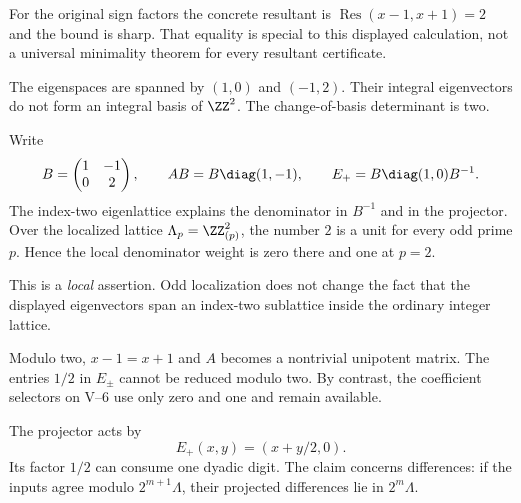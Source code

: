 For the original sign factors the concrete resultant is $\operatorname{Res}(x-1,x+1)=2$ and the bound is sharp. That equality is special to this displayed calculation, not a universal minimality theorem for every resultant certificate.


The eigenspaces are spanned by $(1,0)$ and $(-1,2)$. Their integral eigenvectors do not form an integral basis of $\ZZ^2$. The change-of-basis determinant is two.


Write
\[
B=\begin{pmatrix}1&-1\\0&2\end{pmatrix},\qquad
AB=B\diag(1,-1),\qquad
E_+=B\diag(1,0)B^{-1}.
\]
The index-two eigenlattice explains the denominator in $B^{-1}$ and in the projector. Over the localized lattice $\Lambda_p=\ZZ_{(p)}^2$, the number $2$ is a unit for every odd prime $p$. Hence the local denominator weight is zero there and one at $p=2$.

This is a \emph{local} assertion. Odd localization does not change the fact that the displayed eigenvectors span an index-two sublattice inside the ordinary integer lattice.

Modulo two, $x-1=x+1$ and $A$ becomes a nontrivial unipotent matrix. The entries $1/2$ in $E_\pm$ cannot be reduced modulo two. By contrast, the coefficient selectors on V--6 use only zero and one and remain available.


The projector acts by
\[
E_+(x,y)=(x+y/2,0).
\]
Its factor $1/2$ can consume one dyadic digit. The claim concerns differences: if the inputs agree modulo $2^{m+1}\Lambda$, their projected differences lie in $2^m\Lambda$.

